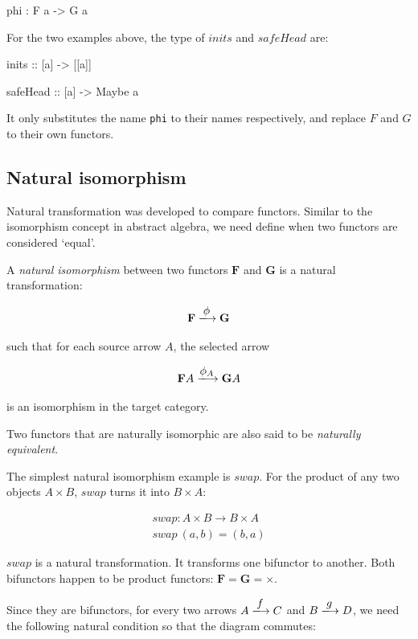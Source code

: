 \documentclass[b5paper]{article}
\begin{document}
\begin{Haskell}
phi : F a -> G a
\end{Haskell}

For the two examples above, the type of $inits$ and $safeHead$ are:

\begin{Haskell}
inits :: [a] -> [[a]]

safeHead :: [a] -> Maybe a
\end{Haskell}

It only substitutes the name \texttt{phi} to their names respectively, and replace $F$ and $G$ to their own functors.

\subsection{Natural isomorphism}

Natural transformation was developed to compare functors. Similar to the isomorphism concept in abstract algebra, we need define when two functors are considered `equal'.

\begin{definition}
\normalfont
A {\em natural isomorphism} between two functors $\mathbf{F}$ and $\mathbf{G}$ is a natural transformation:

\[
  \mathbf{F} \arrowto{\phi} \mathbf{G}
\]

such that for each source arrow $A$, the selected arrow

\[
  \mathbf{F}A \arrowto{\phi_A} \mathbf{G}A
\]

is an isomorphism in the target category.
\end{definition}

Two functors that are naturally isomorphic are also said to be {\em naturally equivalent}.

The simplest natural isomorphism example is $swap$. For the product of any two objects $A \times B$, $swap$ turns it into $B \times A$:

\[
\begin{array}{l}
swap : A \times B \to B \times A \\
swap\ (a, b) = (b, a)
\end{array}
\]

$swap$ is a natural transformation. It transforms one bifunctor to another. Both bifunctors happen to be product functors: $\mathbf{F} = \mathbf{G} = \times$.

Since they are bifunctors, for every two arrows $A \arrowto{f} C$ and $B \arrowto{g} D$, we need the following natural condition so that the diagram commutes:
\end{document}
